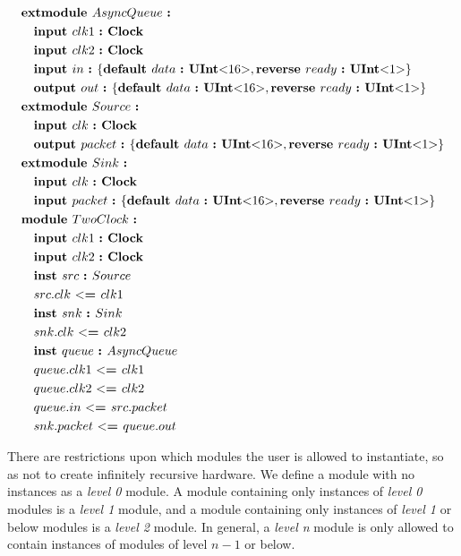 \documentclass[12pt]{article}
\begin{document}
{ \fontsize{11pt}{1.15em}\selectfont
\[
\begin{aligned}
&\kw{extmodule} AsyncQueue \ \kws{:} \\
&\quad \kw{input} clk1 \ \kw{:} \kws{Clock} \\
&\quad \kw{input} clk2 \ \kw{:} \kws{Clock} \\
&\quad \kw{input} in  \ \kw{:} \bundleT{\kw{default} data \ \kw{:} \kws{UInt$<$}16\kws{$>$},\kw{reverse} ready \ \kw{:} \kws{UInt$<$}1\kws{$>$}} \\
&\quad \kw{output} out  \ \kw{:} \bundleT{\kw{default} data \ \kw{:} \kws{UInt$<$}16\kws{$>$},\kw{reverse} ready \ \kw{:} \kws{UInt$<$}1\kws{$>$}} \\
&\kw{extmodule} Source \ \kws{:} \\
&\quad \kw{input} clk \ \kw{:} \kws{Clock} \\
&\quad \kw{output} packet  \ \kw{:} \bundleT{\kw{default} data \ \kw{:} \kws{UInt$<$}16\kws{$>$},\kw{reverse} ready \ \kw{:} \kws{UInt$<$}1\kws{$>$}} \\
&\kw{extmodule} Sink \ \kws{:} \\
&\quad \kw{input} clk \ \kw{:} \kws{Clock} \\
&\quad \kw{input} packet  \ \kw{:} \bundleT{\kw{default} data \ \kw{:} \kws{UInt$<$}16\kws{$>$},\kw{reverse} ready \ \kw{:} \kws{UInt$<$}1\kws{$>$}} \\
&\kw{module} TwoClock \ \kws{:} \\
&\quad \kw{input} clk1 \ \kw{:} \kws{Clock} \\
&\quad \kw{input} clk2 \ \kw{:} \kws{Clock} \\
&\quad \kw{inst} src \ \kw{:} Source \\
&\quad src.clk \ \kw{$<$=} clk1 \\
&\quad \kw{inst} snk \ \kw{:} Sink \\
&\quad snk.clk \ \kw{$<$=} clk2 \\
&\quad \kw{inst} queue \ \kw{:} AsyncQueue \\
&\quad queue.clk1 \ \kw{$<$=} clk1 \\
&\quad queue.clk2 \ \kw{$<$=} clk2 \\
&\quad queue.in \ \kw{$<$=} src.packet \\
&\quad snk.packet \ \kw{$<$=} queue.out \\
\end{aligned}
\]
}

There are restrictions upon which modules the user is allowed to instantiate, so as not to create infinitely recursive hardware.
We define a module with no instances as a {\em level 0} module.
A module containing only instances of {\em level 0} modules is a {\em level 1} module, and a module containing only instances of {\em level 1} or below modules is a {\em level 2} module.
In general, a {\em level n} module is only allowed to contain instances of modules of level $n-1$ or below. 
\end{document}
